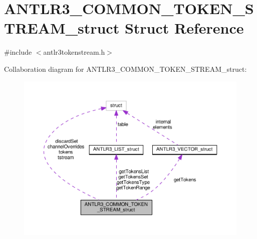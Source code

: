 \hypertarget{struct_a_n_t_l_r3___c_o_m_m_o_n___t_o_k_e_n___s_t_r_e_a_m__struct}{\section{A\-N\-T\-L\-R3\-\_\-\-C\-O\-M\-M\-O\-N\-\_\-\-T\-O\-K\-E\-N\-\_\-\-S\-T\-R\-E\-A\-M\-\_\-struct Struct Reference}
\label{struct_a_n_t_l_r3___c_o_m_m_o_n___t_o_k_e_n___s_t_r_e_a_m__struct}
}


{\ttfamily \#include $<$antlr3tokenstream.\-h$>$}



Collaboration diagram for A\-N\-T\-L\-R3\-\_\-\-C\-O\-M\-M\-O\-N\-\_\-\-T\-O\-K\-E\-N\-\_\-\-S\-T\-R\-E\-A\-M\-\_\-struct\-:
\nopagebreak
\begin{figure}[H]
\begin{center}
\leavevmode
\includegraphics[width=350pt]{struct_a_n_t_l_r3___c_o_m_m_o_n___t_o_k_e_n___s_t_r_e_a_m__struct__coll__graph}
\end{center}
\end{figure}
